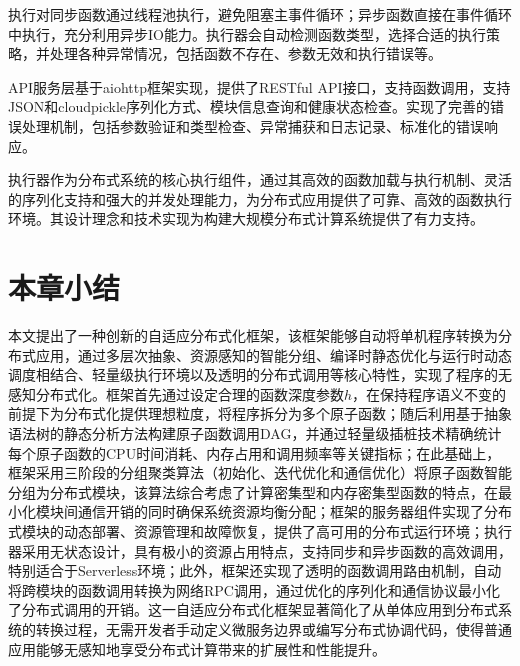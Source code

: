 执行对同步函数通过线程池执行，避免阻塞主事件循环；异步函数直接在事件循环中执行，充分利用异步IO能力。执行器会自动检测函数类型，选择合适的执行策略，并处理各种异常情况，包括函数不存在、参数无效和执行错误等。

API服务层基于aiohttp框架实现，提供了RESTful API接口，支持函数调用，支持JSON和cloudpickle序列化方式、模块信息查询和健康状态检查。实现了完善的错误处理机制，包括参数验证和类型检查、异常捕获和日志记录、标准化的错误响应。

执行器作为分布式系统的核心执行组件，通过其高效的函数加载与执行机制、灵活的序列化支持和强大的并发处理能力，为分布式应用提供了可靠、高效的函数执行环境。其设计理念和技术实现为构建大规模分布式计算系统提供了有力支持。

\section{本章小结}

本文提出了一种创新的自适应分布式化框架，该框架能够自动将单机程序转换为分布式应用，通过多层次抽象、资源感知的智能分组、编译时静态优化与运行时动态调度相结合、轻量级执行环境以及透明的分布式调用等核心特性，实现了程序的无感知分布式化。框架首先通过设定合理的函数深度参数$h$，在保持程序语义不变的前提下为分布式化提供理想粒度，将程序拆分为多个原子函数；随后利用基于抽象语法树的静态分析方法构建原子函数调用DAG，并通过轻量级插桩技术精确统计每个原子函数的CPU时间消耗、内存占用和调用频率等关键指标；在此基础上，框架采用三阶段的分组聚类算法（初始化、迭代优化和通信优化）将原子函数智能分组为分布式模块，该算法综合考虑了计算密集型和内存密集型函数的特点，在最小化模块间通信开销的同时确保系统资源均衡分配；框架的服务器组件实现了分布式模块的动态部署、资源管理和故障恢复，提供了高可用的分布式运行环境；执行器采用无状态设计，具有极小的资源占用特点，支持同步和异步函数的高效调用，特别适合于Serverless环境；此外，框架还实现了透明的函数调用路由机制，自动将跨模块的函数调用转换为网络RPC调用，通过优化的序列化和通信协议最小化了分布式调用的开销。这一自适应分布式化框架显著简化了从单体应用到分布式系统的转换过程，无需开发者手动定义微服务边界或编写分布式协调代码，使得普通应用能够无感知地享受分布式计算带来的扩展性和性能提升。